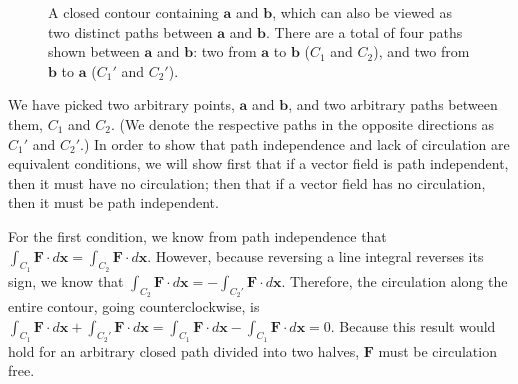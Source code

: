 \documentclass{myarticle}
\renewcommand{\vec}[1]{\mathbf{#1}}
\theoremstyle{nospace}
\newtheorem{old series theorem}{Theorem}
\newenvironment{series theorem}
{\begin{mdframed}\begin{old series theorem}}
    {\end{old series theorem}\end{mdframed}}
\begin{document}
\begin{figure}[htb!] \centering
  \caption{A closed contour containing $\vec{a}$ and $\vec{b}$, which
    can also be viewed as two distinct paths between $\vec{a}$ and
    $\vec{b}$. There are a total of four paths shown between $\vec{a}$
    and $\vec{b}$: two from $\vec{a}$ to $\vec{b}$ ($C_1$ and $C_2$),
    and two from $\vec{b}$ to $\vec{a}$ ($C_1'$ and $C_2'$).}
  \label{fig:no circulation}
\end{figure}

We have picked two arbitrary points, $\vec{a}$ and $\vec{b}$, and two
arbitrary paths between them, $C_1$ and $C_2$. (We denote the
respective paths in the opposite directions as $C_1'$ and $C_2'$.) In
order to show that path independence and lack of circulation are
equivalent conditions, we will show first that if a vector field is
path independent, then it must have no circulation; then that if a
vector field has no circulation, then it must be path independent.

For the first condition, we know from path independence that
$\int_{C_1} \vec{F} \cdot d\vec{x} = \int_{C_2} \vec{F} \cdot
d\vec{x}$. However, because reversing a line integral reverses its
sign, we know that $\int_{C_2} \vec{F} \cdot d\vec{x} = -\int_{C_2'}
\vec{F} \cdot d\vec{x}$. Therefore, the circulation along the entire
contour, going counterclockwise, is $\int_{C_1} \vec{F} \cdot d\vec{x}
+ \int_{C_2'} \vec{F} \cdot d\vec{x} = \int_{C_1} \vec{F} \cdot
d\vec{x} - \int_{C_1} \vec{F} \cdot d\vec{x} = 0$. Because this result
would hold for an arbitrary closed path divided into two halves,
$\vec{F}$ must be circulation free.
\end{document}
